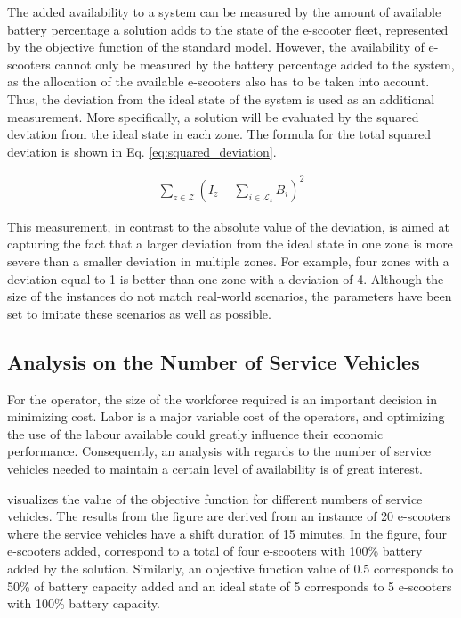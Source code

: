 The added availability to a system can be measured by the amount of available battery percentage a solution adds to the state of the e-scooter fleet, represented by the objective function of the standard model. However, the availability of e-scooters cannot only be measured by the battery percentage added to the system, as the allocation of the available e-scooters also has to be taken into account. Thus, the deviation from the ideal state of the system is used as an additional measurement. More specifically, a solution will be evaluated by the squared deviation from the ideal state in each zone. The formula for the total squared deviation is shown in Eq. \eqref{eq:squared_deviation}.  

\begin{eqnarray}
    \displaystyle\sum_{z\in \mathcal{Z}}\left(I_z - \displaystyle\sum_{i\in \mathcal{L}_z} B_i\right)
    ^2\label{eq:squared_deviation}
\end{eqnarray}

This measurement, in contrast to the absolute value of the deviation, is aimed at capturing the fact that a larger deviation from the ideal state in one zone is more severe than a smaller deviation in multiple zones. For example, four zones with a deviation equal to 1 is better than one zone with a deviation of 4. Although the size of the instances do not match real-world scenarios, the parameters have been set to imitate these scenarios as well as possible. 

\subsection{Analysis on the Number of Service Vehicles}

For the operator, the size of the workforce required is an important decision in minimizing cost. Labor is a major variable cost of the operators, and optimizing the use of the labour available could greatly influence their economic performance. Consequently, an analysis with regards to the number of service vehicles needed to maintain a certain level of availability is of great interest. 

 visualizes the value of the objective function for different numbers of service vehicles. The results from the figure are derived from an instance of 20 e-scooters where the service vehicles have a shift duration of 15 minutes. In the figure, four e-scooters added, correspond to a total of four e-scooters with 100\% battery added by the solution. Similarly, an objective function value of 0.5 corresponds to 50\% of battery capacity added and an ideal state of 5 corresponds to 5 e-scooters with 100\% battery capacity. 

